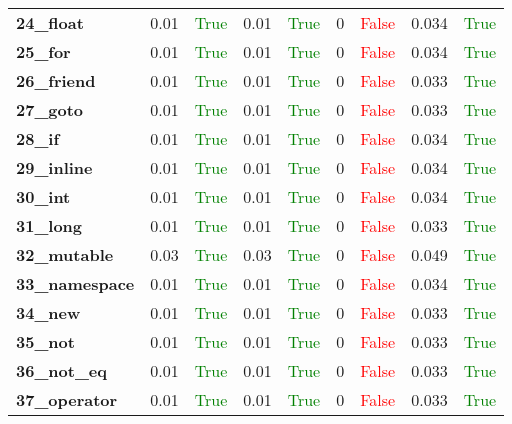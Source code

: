 \documentclass{article}
\begin{document}
\begin{xltabular}{\textwidth}{lcccccccc}
\textbf{24\_float}& 0.01&\textcolor{green}{True}& 0.01&\textcolor{green}{True}& 0&\textcolor{red}{False}& 0.034&\textcolor{green}{True} \\[0.5ex]
\textbf{25\_for}& 0.01&\textcolor{green}{True}& 0.01&\textcolor{green}{True}& 0&\textcolor{red}{False}& 0.034&\textcolor{green}{True} \\[0.5ex]
\textbf{26\_friend}& 0.01&\textcolor{green}{True}& 0.01&\textcolor{green}{True}& 0&\textcolor{red}{False}& 0.033&\textcolor{green}{True} \\[0.5ex]
\textbf{27\_goto}& 0.01&\textcolor{green}{True}& 0.01&\textcolor{green}{True}& 0&\textcolor{red}{False}& 0.033&\textcolor{green}{True} \\[0.5ex]
\textbf{28\_if}& 0.01&\textcolor{green}{True}& 0.01&\textcolor{green}{True}& 0&\textcolor{red}{False}& 0.034&\textcolor{green}{True} \\[0.5ex]
\textbf{29\_inline}& 0.01&\textcolor{green}{True}& 0.01&\textcolor{green}{True}& 0&\textcolor{red}{False}& 0.034&\textcolor{green}{True} \\[0.5ex]
\textbf{30\_int}& 0.01&\textcolor{green}{True}& 0.01&\textcolor{green}{True}& 0&\textcolor{red}{False}& 0.034&\textcolor{green}{True} \\[0.5ex]
\textbf{31\_long}& 0.01&\textcolor{green}{True}& 0.01&\textcolor{green}{True}& 0&\textcolor{red}{False}& 0.033&\textcolor{green}{True} \\[0.5ex]
\textbf{32\_mutable}& 0.03&\textcolor{green}{True}& 0.03&\textcolor{green}{True}& 0&\textcolor{red}{False}& 0.049&\textcolor{green}{True} \\[0.5ex]
\textbf{33\_namespace}& 0.01&\textcolor{green}{True}& 0.01&\textcolor{green}{True}& 0&\textcolor{red}{False}& 0.034&\textcolor{green}{True} \\[0.5ex]
\textbf{34\_new}& 0.01&\textcolor{green}{True}& 0.01&\textcolor{green}{True}& 0&\textcolor{red}{False}& 0.033&\textcolor{green}{True} \\[0.5ex]
\textbf{35\_not}& 0.01&\textcolor{green}{True}& 0.01&\textcolor{green}{True}& 0&\textcolor{red}{False}& 0.033&\textcolor{green}{True} \\[0.5ex]
\textbf{36\_not\_eq}& 0.01&\textcolor{green}{True}& 0.01&\textcolor{green}{True}& 0&\textcolor{red}{False}& 0.033&\textcolor{green}{True} \\[0.5ex]
\textbf{37\_operator}& 0.01&\textcolor{green}{True}& 0.01&\textcolor{green}{True}& 0&\textcolor{red}{False}& 0.033&\textcolor{green}{True} \\[0.5ex]

\end{xltabular}
\end{document}

